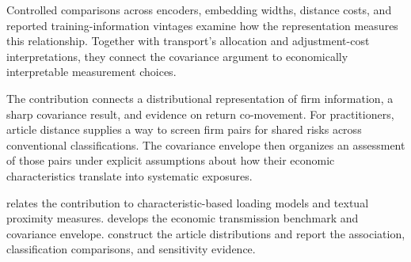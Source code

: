 Controlled comparisons across encoders, embedding widths, distance costs,
and reported training-information vintages examine how the representation
measures this relationship.
Together with transport's allocation and adjustment-cost interpretations,
they connect the covariance argument to economically interpretable
measurement choices.

The contribution connects a distributional representation of firm information,
a sharp covariance result, and evidence on return co-movement.
For practitioners, article distance supplies a way to screen firm pairs for
shared risks across conventional classifications.
The covariance envelope then organizes an assessment of those pairs under
explicit assumptions about how their economic characteristics translate into
systematic exposures.

 relates the contribution to characteristic-based loading
models and textual proximity measures.
 develops the economic transmission benchmark and
covariance envelope.
 construct the article distributions
and report the association, classification comparisons, and sensitivity evidence.
